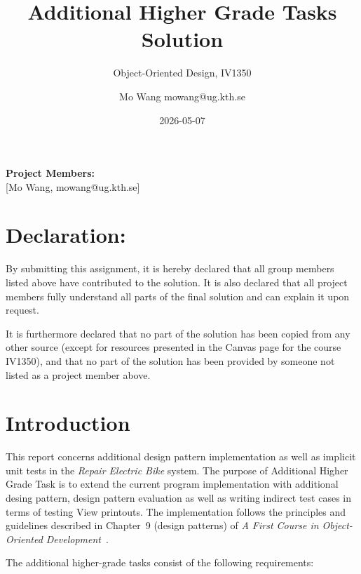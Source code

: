 \documentclass[a4paper]{scrartcl}
\title{Additional Higher Grade Tasks Solution}
\subtitle{Object-Oriented Design, IV1350}
\author{Mo Wang mowang@ug.kth.se}
\date{2026-05-07}
\begin{document}
\maketitle
\noindent\textbf{Project Members:} \\ \hfill
[Mo Wang, mowang@ug.kth.se]

\section*{Declaration:}

By submitting this assignment, it is hereby declared that all group members listed above have contributed to the solution. It is also declared that all project members fully understand all parts of the final solution and can explain it upon request.

It is furthermore declared that no part of the solution has been copied from any other source (except for resources presented in the Canvas page for the course IV1350), and that no part of the solution has been provided by someone not listed as a project member above.

\section{Introduction}
\label{sec:intro}

This report concerns additional design pattern implementation as well as implicit unit tests in the \textit{Repair Electric Bike} system. The purpose of Additional Higher Grade Task is to extend the current program implementation with additional desing pattern, design pattern evaluation as well as writing indirect test cases in terms of testing View printouts. The implementation follows the principles and guidelines described in Chapter~9 (design patterns) of \textit{A First Course in Object-Oriented Development}~\cite{coursebook}.

The additional higher-grade tasks consist of the following requirements:
\end{document}
